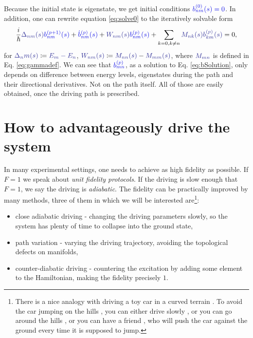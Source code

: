 Because the initial state is eigenstate, we get initial conditions $\blue{b_{nm}^{(0)}(s)=0}$. In addition, one can rewrite equation \ref{eq:solve0} to the iteratively solvable form
\begin{equation}
    \frac{i}{\hbar}\bluee{\Delta_{nm}(s)}\blue{b_{nm}^{(p+1)}(s)}+\blue{\dot b_{nm}^{(p)}(s)}+\bluee{W_{nm}(s)} \blue{b_{nm}^{(p)}(s)}+\sum_{k=0,k\neq n}\bluee{M_{nk}(s)}\bluee{b_{km}^{(p)}(s)}=0,
    \label{eq:bSolution}
\end{equation}
for $\bluee{\Delta_nm(s)}\coloneqq \bluee{E_m-E_n}$, $\bluee{W_{nm}(s)}\coloneqq \bluee{M_{nn}(s)}-\bluee{M_{mm}(s)}$, where $\bluee{M_{mn}}$ is defined in Eq. \ref{eq:gammadef}. We can see that $\blue{b_{mn}^{(p)}}$, as a solution to Eq. \ref{eq:bSolution}, only depends on difference between energy levels, eigenstates during the path and their directional derivatives. Not on the path itself. All of those are easily obtained, once the driving path is prescribed.











\section{How to advantageously drive the system}
\label{chap:typesOfDriving}
In many experimental settings, one needs to achieve as high fidelity as possible. If $F=1$ we speak about \emph{unit fidelity protocols}. If the driving is slow enough that $F=1$, we say the driving is \emph{adiabatic}. The fidelity can be practically improved by many methods, three of them in which we will be interested are\footnote{There is a nice analogy with driving a toy car  in a curved terrain . To avoid the car jumping on the hills , you can either drive slowly , or you can go around the hills , or you can have a friend , who will push the car against the ground every time it is supposed to jump.}:
\begin{itemize}
    \item close adiabatic driving - changing the driving parameters slowly, so the system has plenty of time to collapse into the ground state,
    \item path variation - varying the driving trajectory, avoiding the topological defects on manifolds,
    \item counter-diabatic driving - countering the excitation by adding some element to the Hamiltonian, making the fidelity precisely $1$.
\end{itemize}



